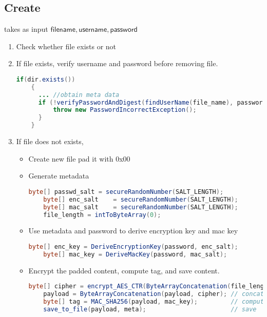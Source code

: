 \documentclass[a4paper,10pt]{article}
\begin{document}
\subsection{Create} %
\label{sub:create}
takes as input $\mathsf{filename, username, password}$
\begin{enumerate}
  \item Check whether file exists or not
  \item If file exists, verify username and password before removing file.
  \begin{lstlisting}[linewidth=\columnwidth,breaklines=true,language=Java]
  if(dir.exists())
    {
      ... //obtain meta data
      if (!verifyPasswordAndDigest(findUserName(file_name), passwordDigest, passwd_salt, password)) {
          throw new PasswordIncorrectException();    
      }
    }
  \end{lstlisting}
  \item If file does not exists,
  \begin{itemize}
    \item Create new file pad it with 0x00 
    \item Generate metadata
    \begin{lstlisting}[linewidth=.5\columnwidth,breaklines=true,language=Java]
    byte[] passwd_salt = secureRandomNumber(SALT_LENGTH);
    byte[] enc_salt    = secureRandomNumber(SALT_LENGTH);
    byte[] mac_salt    = secureRandomNumber(SALT_LENGTH);
    file_length = intToByteArray(0);
    \end{lstlisting}
    \item Use metadata and password to derive encryption key and mac key
    \begin{lstlisting}[linewidth=.5\columnwidth,breaklines=true,language=Java]
    byte[] enc_key = DeriveEncryptionKey(password, enc_salt);
    byte[] mac_key = DeriveMacKey(password, mac_salt);
    \end{lstlisting}
    \item Encrypt the padded content, compute tag, and save content.
    \begin{lstlisting}[linewidth=\columnwidth,breaklines=true,language=Java]
    byte[] cipher = encrypt_AES_CTR(ByteArrayConcatenation(file_length,contentToEncrypt.getBytes()), enc_key); // encrypt file length
    payload = ByteArrayConcatenation(payload, cipher); // concatenate metadata with cipher
    byte[] tag = MAC_SHA256(payload, mac_key);         // compute tag
    save_to_file(payload, meta);                       // save
    \end{lstlisting}
  \end{itemize}
\end{enumerate}
\end{document}
